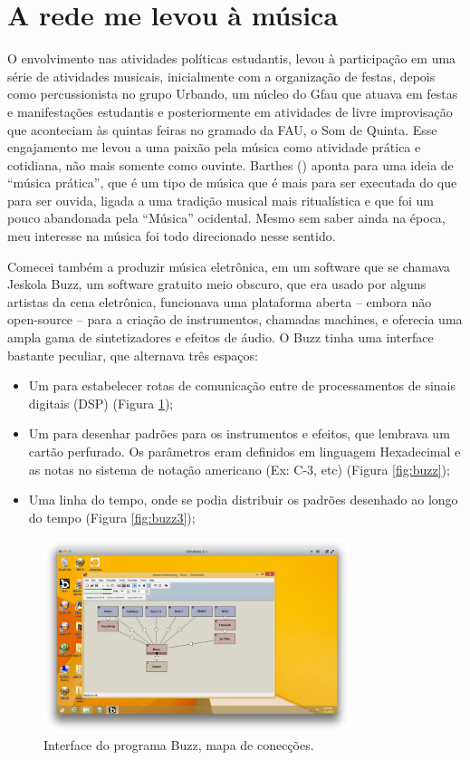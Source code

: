 \section{A rede me levou à música}
O envolvimento nas atividades políticas estudantis, levou à participação em uma série de atividades musicais, inicialmente com a organização de festas, depois como percussionista no grupo Urbando, um núcleo do Gfau que atuava em festas e manifestações estudantis e posteriormente em atividades de livre improvisação que aconteciam às quintas feiras no gramado da FAU, o Som de Quinta. Esse engajamento me levou a uma paixão pela música como atividade prática e cotidiana, não mais somente como ouvinte. Barthes (\citeyear{Barthes1978}) aponta para uma ideia de ``música prática'', que é um tipo de música que é mais para ser executada do que para ser ouvida, ligada a uma tradição musical mais ritualística e que foi um pouco abandonada pela ``Música'' ocidental. Mesmo sem saber ainda na época, meu interesse na música foi todo direcionado nesse sentido.


Comecei também a produzir música eletrônica, em um software que se chamava Jeskola Buzz, um software gratuito meio obscuro, que era usado por alguns artistas da cena eletrônica, funcionava uma plataforma aberta – embora não open-source – para a criação de instrumentos, chamadas machines, e oferecia uma ampla gama de sintetizadores e efeitos de áudio. O Buzz tinha uma interface bastante peculiar, que alternava três espaços:

\begin{itemize}
\item Um para estabelecer rotas de comunicação entre de processamentos de sinais digitais (DSP) (Figura \ref{fig:buzz1});
\item Um para desenhar padrões para os instrumentos e efeitos, que lembrava um cartão perfurado. Os parâmetros eram definidos em linguagem Hexadecimal e as notas no sistema de notação americano (Ex: C-3, etc) (Figura \ref{fig:buzz});
\item Uma linha do tempo, onde se podia distribuir os padrões desenhado ao longo do tempo (Figura \ref{fig:buzz3});
\end{itemize}

\begin{figure}

\includegraphics[width=0.8\textwidth]{pictures/cap1/buzz1}
\caption{Interface do programa Buzz, mapa de conecções.}
\label{fig:buzz1}
\end{figure}


